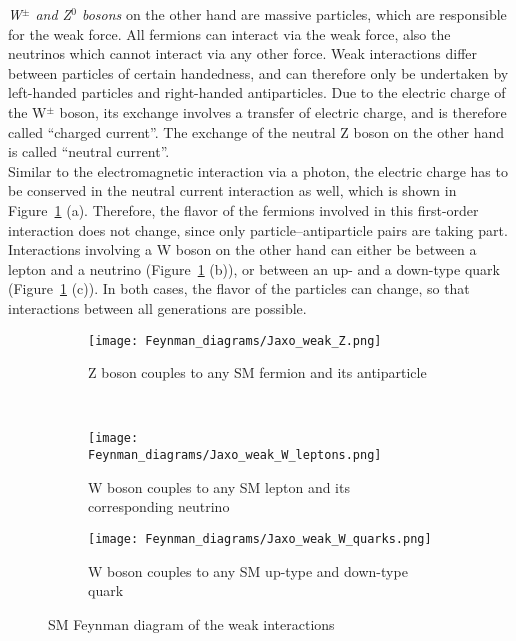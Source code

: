 \begin{minipage}{0.55\textwidth}
\textit{W$^\pm$ and Z$^0$ bosons} on the other hand are massive particles, which are responsible for the weak force.
All fermions can interact via the weak force, also the neutrinos which cannot interact via any other force.
Weak interactions differ between particles of certain handedness, and can therefore only be undertaken by left-handed particles and right-handed antiparticles.
Due to the electric charge of the W$^\pm$ boson, its exchange involves a transfer of electric charge, and is therefore called ``charged current''.
The exchange of the neutral Z boson on the other hand is called ``neutral current''.\\
Similar to the electromagnetic interaction via a photon, the electric charge has to be conserved in the neutral current interaction as well, which is shown in Figure~\ref{fig:Feynman:weak} (a).
Therefore, the flavor of the fermions involved in this first-order interaction does not change, since only particle--antiparticle pairs are taking part.
Interactions involving a W boson on the other hand can either be between a lepton and a neutrino (Figure~\ref{fig:Feynman:weak} (b)), or between an up- and a down-type quark (Figure~\ref{fig:Feynman:weak} (c)). 
In both cases, the flavor of the particles can change, so that interactions between all generations are possible.
\end{minipage} \hfill
\begin{minipage}{0.4\textwidth}
\centering
\begin{figure}[H]
\centering
\begin{subfigure}[b]{\textwidth}\centering
\texttt{[image: Feynman\_diagrams/Jaxo\_weak\_Z.png]}
\caption{Z boson couples to any SM fermion and its antiparticle}
\end{subfigure}\\
\begin{subfigure}[t]{0.48\textwidth}\centering
\texttt{[image: Feynman\_diagrams/Jaxo\_weak\_W\_leptons.png]}
\caption{W boson couples to any SM lepton and its corresponding neutrino}
\end{subfigure}\hfill
\begin{subfigure}[t]{0.48\textwidth}\centering
\texttt{[image: Feynman\_diagrams/Jaxo\_weak\_W\_quarks.png]}
\caption{W boson couples to any SM up-type and down-type quark}
\end{subfigure}
\caption{SM Feynman diagram of the weak interactions}
\label{fig:Feynman:weak} 
\end{figure}
\end{minipage}

